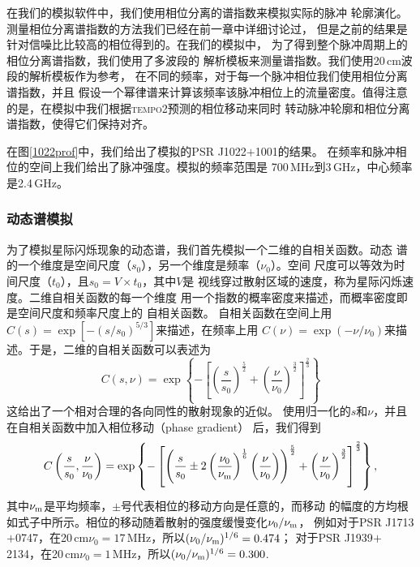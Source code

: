在我们的模拟软件中，我们使用相位分离的谱指数来模拟实际的脉冲
轮廓演化。测量相位分离谱指数的方法我们已经在前一章中详细讨论过，
但是之前的结果是针对信噪比比较高的相位得到的。在我们的模拟中，
为了得到整个脉冲周期上的相位分离谱指数，我们使用了多波段的
解析模板来测量谱指数。我们使用20\,cm波段的解析模板作为参考，
在不同的频率，对于每一个脉冲相位我们使用相位分离谱指数，并且
假设一个幂律谱来计算该频率该脉冲相位上的流量密度。值得注意
的是，在模拟中我们根据\textsc{tempo2}预测的相位移动来同时
转动脉冲轮廓和相位分离谱指数，使得它们保持对齐。

在图\ref{1022prof}中，我们给出了模拟的PSR J1022$+$1001的结果。
在频率和脉冲相位的空间上我们给出了脉冲强度。模拟的频率范围是
700\,MHz到3\,GHz，中心频率是2.4\,GHz。

\subsubsection{动态谱模拟}

为了模拟星际闪烁现象的动态谱，我们首先模拟一个二维的自相关函数。动态
谱的一个维度是空间尺度（$s_0$），另一个维度是频率（$\nu_0$）。空间
尺度可以等效为时间尺度（$t_0$），且$s_0 = V\times t_0$，其中$V$是
视线穿过散射区域的速度，称为星际闪烁速度。二维自相关函数的每一个维度
用一个指数的概率密度来描述，而概率密度即是空间尺度和频率尺度上的
自相关函数。
%
自相关函数在空间上用$C(s) = \exp[-(s/s_0)^{5/3}]$来描述，在频率上用
$C(\nu) = \exp(-\nu/\nu_0)$来描述。于是，二维的自相关函数可以表述为
\begin{equation}
\label{acf}
C(s,\nu) = \exp\left\{-\left[\left(\frac{s}{s_0}\right)^{\frac{5}{2}} + \left(\frac{\nu}{\nu_0}\right)^{\frac{3}{2}}\right]^{\frac{2}{3}}\right\}
\end{equation}
这给出了一个相对合理的各向同性的散射现象的近似。
%
使用归一化的$s$和$\nu$，并且在自相关函数中加入相位移动（phase gradient）
后，我们得到
\begin{equation}
C\left(\frac{s}{s_0},\frac{\nu}{\nu_0}\right)=\exp\left\{-\left[\left(\frac{s}{s_0} \pm 2\left(\frac{\nu_0}{\nu_{\rm{m}}}\right)^{\frac{1}{6}}\left(\frac{\nu}{\nu_0}\right)\right)^{\frac{5}{2}} + \left(\frac{\nu}{\nu_0}\right)^{\frac{3}{2}}\right]^{\frac{2}{3}}\right\},
\end{equation}
其中$\nu_{\rm{m}}$是平均频率，$\pm$号代表相位的移动方向是任意的，而移动
的幅度的方均根如式子中所示。相位的移动随着散射的强度缓慢变化$\nu_0/\nu_{\rm{m}}$，
例如对于PSR J1713$+$0747，在20\,cm$\nu_0=17$\,MHz，所以$(\nu_0/\nu_{\rm{m}})^{1/6} = 0.474$；
对于PSR J1939$+$2134，在20\,cm$\nu_0=1$\,MHz，所以$(\nu_0/\nu_{\rm{m}})^{1/6} = 0.300$.

